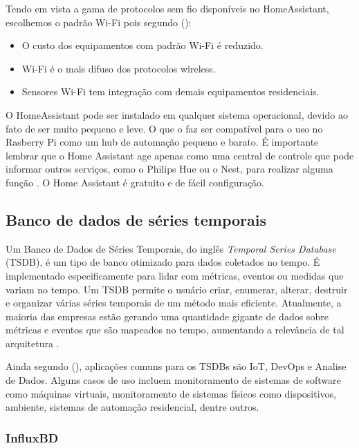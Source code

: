 Tendo em vista a gama de protocolos sem fio disponíveis no HomeAssistant, escolhemos o padrão Wi-Fi pois segundo \citeauthor{Lundrigan2017} (\citeyear{Lundrigan2017}):

\begin{itemize}
	\item O custo dos equipamentos com padrão Wi-Fi é reduzido.
	\item Wi-Fi é o mais difuso dos protocolos wireless.
	\item Sensores Wi-Fi tem integração com demais equipamentos residenciais.
\end{itemize}

O HomeAssistant pode ser instalado em qualquer sistema operacional, devido ao fato de ser muito pequeno e leve. O que o faz ser compatível para o uso no Rasberry Pi como um hub de automação pequeno e barato. É importante lembrar que o Home Assistant age apenas como uma central de controle que pode informar outros serviços, como o Philips Hue ou o Nest, para realizar alguma função \cite{AlmeidaCosta}. O Home Assistant é gratuito e de fácil configuração.

\subsection{Banco de dados de séries temporais}

Um Banco de Dados de Séries Temporais, do inglês \textit{Temporal Series Database} (TSDB), é um tipo de banco otimizado para dados coletados no tempo. É implementado especificamente para lidar com métricas, eventos ou medidas que variam no tempo. Um TSDB permite o usuário criar, enumerar, alterar, destruir e organizar várias séries temporais de um método mais eficiente. Atualmente, a maioria das empresas estão gerando uma quantidade gigante de dados sobre métricas e eventos que são mapeados no tempo, aumentando a relevância de tal arquitetura \cite{Noor2017}.

Ainda segundo \citeauthor{Noor2017} (\citeyear{Noor2017}), aplicações comuns para os TSDBs são IoT, DevOps e Analise de Dados. Alguns casos de uso incluem monitoramento de sistemas de software como máquinas virtuais, monitoramento de sistemas físicos como dispositivos, ambiente, sistemas de automação residencial, dentre outros.

\subsubsection{InfluxBD}

